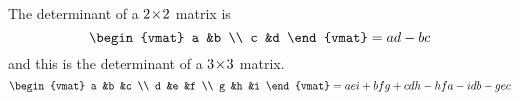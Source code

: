 \documentclass[answers, nolegalese, 11pt]{examjh}
\begin{document}
\thispagestyle{empty}
\vspace{-1ex}
\makebox[\textwidth]{\hbox{}\hrulefill\hbox{}}

The determinant of a $2 \! \times \! 2$ matrix is
\begin{equation*}
\begin{vmat}
  a  &b  \\
  c  &d
\end{vmat}
=ad-bc
\end{equation*}
and this is the determinant of a $3 \! \times \! 3$ matrix.
\begin{equation*}
     \begin{vmat}
           a  &b  &c  \\
           d  &e  &f  \\
           g  &h  &i
     \end{vmat}
  =
    aei+bfg+cdh-hfa-idb-gec
\end{equation*}
\end{document}
